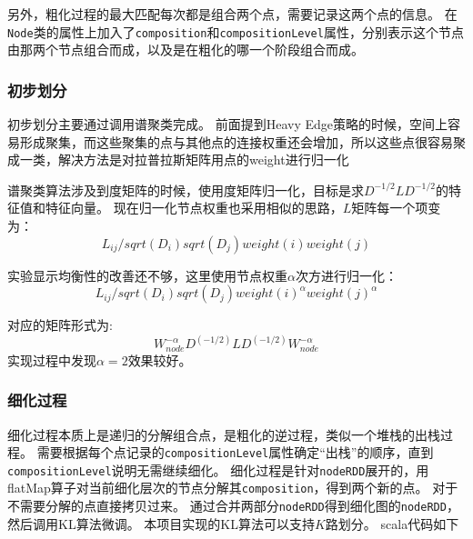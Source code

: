 另外，粗化过程的最大匹配每次都是组合两个点，需要记录这两个点的信息。
在\texttt{Node}类的属性上加入了\texttt{composition}和\texttt{compositionLevel}属性，分别表示这个节点由那两个节点组合而成，以及是在粗化的哪一个阶段组合而成。

\subsubsection{初步划分}

初步划分主要通过调用谱聚类完成。
前面提到Heavy Edge策略的时候，空间上容易形成聚集，而这些聚集的点与其他点的连接权重还会增加，所以这些点很容易聚成一类，解决方法是对拉普拉斯矩阵用点的weight进行归一化

谱聚类算法涉及到度矩阵的时候，使用度矩阵归一化，目标是求$D^{-1/2}LD^{-1/2}$的特征值和特征向量。
现在归一化节点权重也采用相似的思路，$L$矩阵每一个项变为：
$$L_{ij}/sqrt(D_i)sqrt(D_j)weight(i)weight(j)$$

实验显示均衡性的改善还不够，这里使用节点权重$\alpha$次方进行归一化：
$$L_{ij}/sqrt(D_i)sqrt(D_j)weight(i)^{\alpha} weight(j)^{\alpha}$$

对应的矩阵形式为:
$$W_{node}^{-\alpha}D^(-1/2)LD^(-1/2)W_{node}^{-\alpha}$$
实现过程中发现$\alpha=2$效果较好。

\subsubsection{细化过程}

细化过程本质上是递归的分解组合点，是粗化的逆过程，类似一个堆栈的出栈过程。
需要根据每个点记录的\texttt{compositionLevel}属性确定“出栈”的顺序，直到\texttt{compositionLevel}说明无需继续细化。
细化过程是针对\texttt{nodeRDD}展开的，用flatMap算子对当前细化层次的节点分解其\texttt{composition}，得到两个新的点。
对于不需要分解的点直接拷贝过来。
通过合并两部分\texttt{nodeRDD}得到细化图的\texttt{nodeRDD}，然后调用KL算法微调。
本项目实现的KL算法可以支持$K$路划分。
scala代码如下

